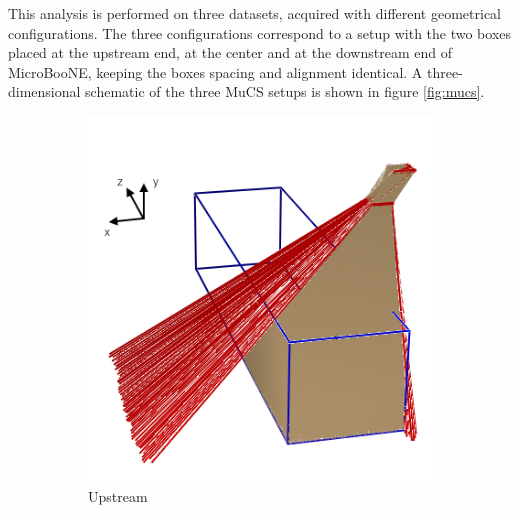\documentclass[a4paper,11pt]{article}
\begin{document}
This analysis is performed on three datasets, acquired with different geometrical configurations. The three configurations correspond to a setup with the two boxes placed at the upstream end, at the center and at the downstream end of MicroBooNE, keeping the boxes spacing and alignment identical.
A three-dimensional schematic of the three MuCS setups is shown in figure \ref{fig:mucs}.

\begin{figure}[htbp]
  \begin{subfigure}{0.30\textwidth}
    \includegraphics[width=\linewidth]{figures/upstream.png}
    \caption{Upstream} \label{fig:upstream}
  \end{subfigure}
  \begin{subfigure}{0.30\textwidth}

\end{subfigure}
\end{figure}
\end{document}
